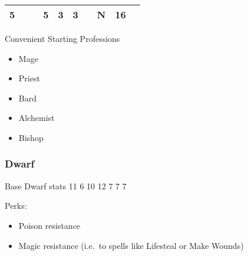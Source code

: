 \documentclass[12pt]{article}
\begin{document}
\begin{longtable}[]{@{}llllllllll@{}}
\begin{minipage}[t]{0.06\columnwidth}\raggedright\strut
5
\strut\end{minipage} &
\begin{minipage}[t]{0.06\columnwidth}\raggedright\strut
\strut\end{minipage} &
\begin{minipage}[t]{0.06\columnwidth}\raggedright\strut
\strut\end{minipage} &
\begin{minipage}[t]{0.06\columnwidth}\raggedright\strut
5
\strut\end{minipage} &
\begin{minipage}[t]{0.06\columnwidth}\raggedright\strut
3
\strut\end{minipage} &
\begin{minipage}[t]{0.06\columnwidth}\raggedright\strut
3
\strut\end{minipage} &
\begin{minipage}[t]{0.06\columnwidth}\raggedright\strut
\strut\end{minipage} &
\begin{minipage}[t]{0.07\columnwidth}\raggedright\strut
N
\strut\end{minipage} &
\begin{minipage}[t]{0.08\columnwidth}\raggedright\strut
16
\strut\end{minipage}\tabularnewline
\bottomrule
\end{longtable}

Convenient Starting Professions

\begin{itemize}
\item
  Mage
\item
  Priest
\item
  Bard
\item
  Alchemist
\item
  Bishop
\end{itemize}

\subsubsection{Dwarf}\label{dwarf}

Base Dwarf stats 11 6 10 12 7 7 7

Perks:

\begin{itemize}
\item
  Poison resistance
\item
  Magic resistance (i.e.~to spells like Lifesteal or Make Wounds)
\end{itemize}
\end{document}
